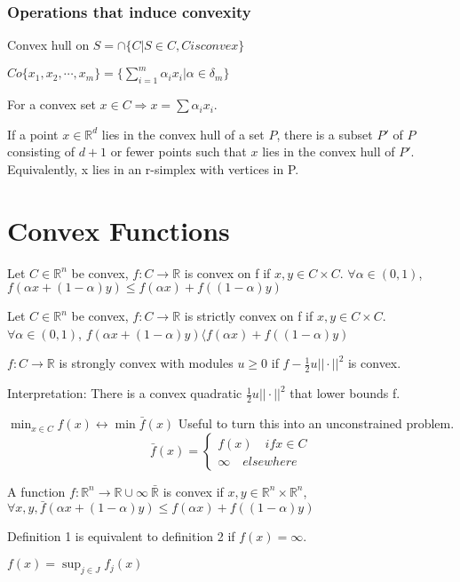 \documentclass[11pt,fleqn]{book} %
\def\R{\mathbb{R}}
\begin{document}
\subsubsection{Operations that induce convexity}
Convex hull on $S = \cap \{C | S\in C, C is convex\}$\\
\begin{example}
$Co \{ x_1,x_2,\cdots,x_m\} = \{ \sum_{i=1}^m \alpha_i x_i | \alpha \in \delta_m \}$
\end{example}
For a convex set $x \in C \Rightarrow x = \sum \alpha_i x_i$. 
\begin{theorem}
If a point $x \in \R^d$ lies in the convex hull of a set $P$, there is a subset $P'$ of $P$ consisting of $d + 1$ or fewer points such that $x$ lies in the convex hull of $P'$. Equivalently, x lies in an r-simplex with vertices in P.
\end{theorem}

\section{Convex Functions}
\begin{definition}
Let $C \in \R^n$ be convex, $f:C \to \R$ is convex on f if $x,y \in C \times C$. $\forall \alpha \in (0,1)$, $f(\alpha x + (1-\alpha) y) \le f(\alpha x) + f((1-\alpha) y)$
\end{definition}

\begin{definition}
Let $C \in \R^n$ be convex, $f:C \to \R$ is strictly convex on f if $x,y \in C \times C$. $\forall \alpha \in (0,1)$, $f(\alpha x + (1-\alpha) y) \langle f(\alpha x) + f((1-\alpha) y)$
\end{definition}

\begin{definition}
$f:C \to \R$ is strongly convex with modules $u \ge 0$ if $f - \frac{1}{2}u || \cdot ||^2$ is convex.
\end{definition}
Interpretation: There is a convex quadratic $\frac{1}{2}u || \cdot ||^2$ that lower bounds f.
\begin{example}
$\min_{x \in C} f(x) \leftrightarrow \min \bar{f}(x)$
Useful to turn this into an unconstrained problem. \\
$$\bar{f}(x) = \begin{cases}
f(x) \quad if x \in C \\
\infty \quad  elsewhere
\end{cases}$$
\end{example}
\begin{definition}
A function $f : \R^n \to \R \cup \infty \ \bar{\R}$ is convex if $x,y \in \R^n \times \R^n$, $\forall x,y , \bar{f}(\alpha x + (1-\alpha) y) \le f(\alpha x) + f((1-\alpha) y)$
\end{definition}
Definition 1 is equivalent to definition 2 if $f(x) = \infty$.
\begin{example}
$f(x) = \sup_{j \in J} f_j(x)$
\end{example}
\end{document}
